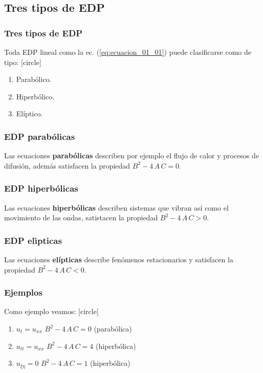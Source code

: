 \subsection{Tres tipos de EDP}
\begin{frame}
\frametitle{Tres tipos de EDP}
Toda EDP lineal como la ec. (\ref{eq:ecuacion_01_01}) puede clasificarse como de tipo:
[circle]
\begin{enumerate}[<+->]
\item Parabólico.
\item Hiperbólico.
\item Elíptico.
\end{enumerate}
\end{frame}
\begin{frame}
\frametitle{EDP parabólicas}
Las ecuaciones \textbf{parabólicas} describen por ejemplo el flujo de calor y procesos de difusión, además satisfacen la propiedad $B^{2} - 4 \, A \, C = 0$.
\end{frame}
\begin{frame}
\frametitle{EDP hiperbólicas}
Las ecuaciones \textbf{hiperbólicas} describen sistemas que vibran así como el movimiento de las ondas, satistacen la propiedad $B^{2} - 4 \, A \, C > 0$.
\end{frame}
\begin{frame}
\frametitle{EDP elìpticas}
Las ecuaciones \textbf{elípticas} describe fenómenos estacionarios y satisfacen la propiedad $B^{2} - 4 \, A \, C < 0$.
\end{frame}
\begin{frame}
\frametitle{Ejemplos}
Como ejemplo veamos:
[circle]
\begin{enumerate}[<+->]
\setlength\itemsep{1em}
\item $u_{t} = u_{xx}$ \hspace{1cm} $B^{2} - 4 \, A \, C = 0$ \hspace{1cm} (parabólica)
\item $u_{tt} = u_{xx}$ \hspace{0.8cm} $B^{2} - 4 \, A \, C = 4$ \hspace{1cm} (hiperbólica)
\item $u_{\xi \eta} = 0$ \hspace{1cm} $B^{2} - 4 \, A \, C = 1$ \hspace{1cm} (hiperbólica)
\seti
\end{enumerate}
\end{frame}

